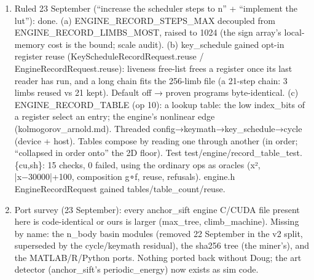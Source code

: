 \begin{enumerate}
\item Ruled 23 September (“increase the scheduler steps to n” + “implement the lut”): done. (a) ENGINE\_\allowbreak{}RECORD\_\allowbreak{}STEPS\_\allowbreak{}MAX decoupled from ENGINE\_\allowbreak{}RECORD\_\allowbreak{}LIMBS\_\allowbreak{}MOST, raised to 1024 (the sign array's local-memory cost is the bound; scale audit). (b) key\_\allowbreak{}schedule gained opt-in register reuse (KeyScheduleRecordRequest.reuse / EngineRecordRequest.reuse): liveness free-list frees a register once its last reader has run, and a long chain fits the 256-limb file (a 21-step chain: 3 limbs reused vs 21 kept). Default off → proven programs byte-identical. (c) ENGINE\_\allowbreak{}RECORD\_\allowbreak{}TABLE (op 10): a lookup table: the low index\_\allowbreak{}bits of a register select an entry; the engine's nonlinear edge (kolmogorov\_\allowbreak{}arnold.md). Threaded config→keymath→key\_\allowbreak{}schedule→cycle (device + host). Tables compose by reading one through another (in order; “collapsed in order onto” the 2D floor). Test test/engine/record\_\allowbreak{}table\_\allowbreak{}test.\{cu,sh\}: 15 checks, 0 failed, using the ordinary ops as oracles (x², |x−30000|+100, composition g∘f, reuse, refusals). engine.h EngineRecordRequest gained tables/table\_\allowbreak{}count/reuse.
\item Port survey (23 September): every anchor\_\allowbreak{}sift engine C/CUDA file present here is code-identical or ours is larger (max\_\allowbreak{}tree, climb\_\allowbreak{}machine). Missing by name: the n\_\allowbreak{}body basin modules (removed 22 September in the v2 split, superseded by the cycle/keymath residual), the sha256 tree (the miner's), and the MATLAB/R/Python ports. Nothing ported back without Doug; the art detector (anchor\_\allowbreak{}sift's periodic\_\allowbreak{}energy) now exists as sim code.

\end{enumerate}
